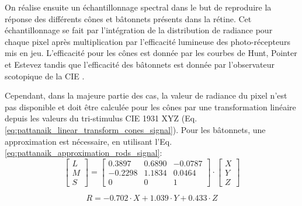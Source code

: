 	\par On réalise ensuite un échantillonnage spectral dans le but de reproduire la réponse des différents cônes et bâtonnets présents dans la rétine. Cet échantillonnage se fait par l'intégration de la distribution de radiance pour chaque pixel après multiplication par l'efficacité lumineuse des photo-récepteurs mis en jeu. L'efficacité pour les cônes est donnée par les courbes de Hunt, Pointer et Estevez \citep{fairchild_color_1998} tandis que l'efficacité des bâtonnets est donnée par l'observateur scotopique de la CIE \citep{wyszecki_color_2000}.
	
	\par Cependant, dans la majeure partie des cas, la valeur de radiance du pixel n'est pas disponible et doit être calculée pour les cônes par une transformation linéaire depuis les valeurs du tri-stimulus CIE 1931 XYZ (Eq. \ref{eq:pattanaik_linear_transform_cones_signal}). Pour les bâtonnets, une approximation est nécessaire, en utilisant l'Eq. \ref{eq:pattanaik_approximation_rods_signal}:
	\begin{equation}
		\left[ \begin{array}{c}L\\ M\\ S\end{array} \right] = \left[ \begin{array}{ccc}
		0.3897 & 0.6890 & -0.0787\\
		-0.2298 & 1.1834 & 0.0464\\
		0 & 0 & 1		
		\end{array} \right] \cdot \left[ \begin{array}{c}X\\ Y\\ Z\end{array} \right]
		\label{eq:pattanaik_linear_transform_cones_signal}
	\end{equation}
	
	\begin{equation}
		R = -0.702 \cdot X + 1.039 \cdot Y + 0.433 \cdot Z
		\label{eq:pattanaik_approximation_rods_signal}
	\end{equation}
	
